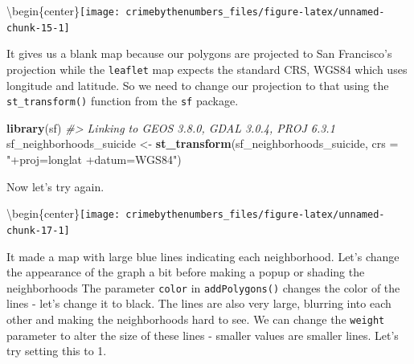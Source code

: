 \documentclass[
  12pt,
]{book}
\newenvironment{Shaded}{\begin{snugshade}}{\end{snugshade}}
\newcommand{\CommentTok}[1]{\textcolor[rgb]{0.37,0.37,0.37}{\textit{#1}}}
\newcommand{\DataTypeTok}[1]{\textcolor[rgb]{0.27,0.27,0.27}{#1}}
\newcommand{\KeywordTok}[1]{\textcolor[rgb]{0.27,0.27,0.27}{\textbf{#1}}}
\newcommand{\NormalTok}[1]{#1}
\newcommand{\OperatorTok}[1]{\textcolor[rgb]{0.43,0.43,0.43}{\textbf{#1}}}
\newcommand{\StringTok}[1]{\textcolor[rgb]{0.5,0.5,0.5}{#1}}
\begin{document}
\textbackslash begin\{center\}\texttt{[image: crimebythenumbers\_files/figure-latex/unnamed-chunk-15-1]}

It gives us a blank map because our polygons are projected to San Francisco's projection while the \texttt{leaflet} map expects the standard CRS, WGS84 which uses longitude and latitude. So we need to change our projection to that using the \texttt{st\_transform()} function from the \texttt{sf} package.

\begin{Shaded}
\begin{Highlighting}[]
\KeywordTok{library}\NormalTok{(sf)}
\CommentTok{\#> Linking to GEOS 3.8.0, GDAL 3.0.4, PROJ 6.3.1}
\NormalTok{sf\_neighborhoods\_suicide <{-}}\StringTok{ }\KeywordTok{st\_transform}\NormalTok{(sf\_neighborhoods\_suicide,}
                                        \DataTypeTok{crs =} \StringTok{"+proj=longlat +datum=WGS84"}\NormalTok{)}
\end{Highlighting}
\end{Shaded}

Now let's try again.

\begin{Shaded}
\end{Shaded}

\textbackslash begin\{center\}\texttt{[image: crimebythenumbers\_files/figure-latex/unnamed-chunk-17-1]}

It made a map with large blue lines indicating each neighborhood. Let's change the appearance of the graph a bit before making a popup or shading the neighborhoods The parameter \texttt{color} in \texttt{addPolygons()} changes the color of the lines - let's change it to black. The lines are also very large, blurring into each other and making the neighborhoods hard to see. We can change the \texttt{weight} parameter to alter the size of these lines - smaller values are smaller lines. Let's try setting this to 1.
\end{document}
